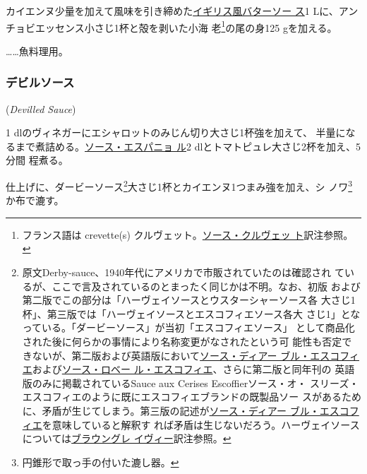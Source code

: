 \begin{recette}
カイエンヌ少量を加えて風味を引き締めた\protect\hyperlink{butter-sauce}{イギリス風バターソー
ス}1 Lに、アンチョビエッセンス小さじ1杯と殻を剥いた小海 老\footnote{フランス語は
  crevette(s)
  クルヴェット。\protect\hyperlink{sauce-aux-crevettes}{ソース・クルヴェッ
  ト}訳注参照。}の尾の身125 gを加える。

\ldots{}\ldots{}魚料理用。

\maeaki

\hypertarget{devilled-sauce}{%
\subsubsection{デビルソース}\label{devilled-sauce}}

 (\emph{Devilled Sauce})


1\undemi{} dlのヴィネガーにエシャロットのみじん切り大さじ1杯強を加えて、
半量になるまで煮詰める。\protect\hyperlink{sauce-espagnole}{ソース・エスパニョ
ル}2\undemi{} dlとトマトピュレ大さじ2杯を加え、5分間 程煮る。

仕上げに、ダービーソース\footnote{原文Derby-sauce、1940年代にアメリカで市販されていたのは確認され
  ているが、ここで言及されているのとまったく同じかは不明。なお、初版
  および第二版でこの部分は「ハーヴェイソースとウスターシャーソース各
  大さじ1杯」、第三版では「ハーヴェイソースとエスコフィエソース各大
  さじ1」となっている。「ダービーソース」が当初「エスコフィエソース」
  として商品化された後に何らかの事情により名称変更がなされたという可
  能性も否定できないが、第二版および英語版において\protect\hyperlink{sauce-diable-escoffier}{ソース・ディアー
  ブル・エスコフィエ}および\protect\hyperlink{sauce-robert-escoffier}{ソース・ロベー
  ル・エスコフィエ}、さらに第二版と同年刊の
  英語版のみに掲載されているSauce aux Cerises Escoffierソース・オ・
  スリーズ・エスコフィエのように既にエスコフィエブランドの既製品ソー
  スがあるために、矛盾が生じてしまう。第三版の記述が\protect\hyperlink{sauce-diable-escoffier}{ソース・ディアー
  ブル・エスコフィエ}を意味していると解釈す
  れば矛盾は生じないだろう。ハーヴェイソースについては\protect\hyperlink{brown-gravy}{ブラウングレ
  イヴィー}訳注参照。}大さじ1杯とカイエンヌ1つまみ強を加え、シ
ノワ\footnote{円錐形で取っ手の付いた漉し器。}か布で漉す。


\end{recette}
